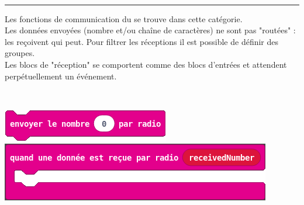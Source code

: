 \begin{minipage}[t]{0.75\linewidth}

    \begin{blocRadio}\\
      \rule{-0.25em}{2em}
      Les fonctions de communication du \mb se trouve dans cette catégorie.\\
      Les données envoyées (nombre et/ou chaîne de caractères) ne sont pas "routées" : les reçoivent qui peut. Pour filtrer les réceptions il est possible de définir des groupes.\\
      \vspace{5mm}
      Les blocs de "réception" se comportent comme des blocs d'entrées et attendent perpétuellement un événement.


    \end{blocRadio}

\end{minipage}
\hfill
\begin{minipage}[t]{0.25\linewidth}~\\
  \vspace{5mm}

    \includegraphics[scale=0.4]{res/blocsMkCd/MB_makecode_radio-envoyer.png}\\[0.5em]
    \includegraphics[scale=0.3]{res/blocsMkCd/MB_makecode_radio-recevoir.png}\\[0.5em]


\end{minipage}

